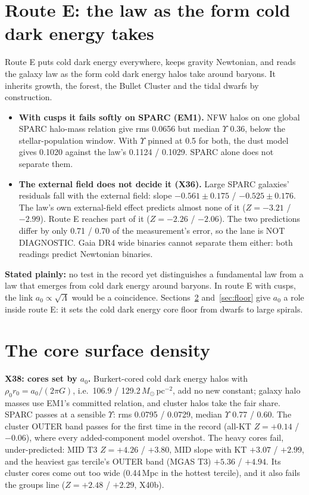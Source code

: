 \documentclass[10pt]{article}
\begin{document}
\section{Route E: the law as the form cold dark energy takes}
Route E puts cold dark energy everywhere, keeps gravity Newtonian, and reads the galaxy law as the form cold dark energy halos take around baryons. It inherits growth, the forest, the Bullet Cluster and the tidal dwarfs by construction.
\begin{itemize}
\item \textbf{With cusps it fails softly on SPARC (EM1).} NFW halos on one global SPARC halo-mass relation give rms 0.0656 but median $\Upsilon$ 0.36, below the stellar-population window. With $\Upsilon$ pinned at 0.5 for both, the dust model gives 0.1020 against the law's 0.1124 / 0.1029. SPARC alone does not separate them.
\item \textbf{The external field does not decide it (X36).} Large SPARC galaxies' residuals fall with the external field: slope $-0.561\pm0.175$ / $-0.525\pm0.176$. The law's own external-field effect predicts almost none of it ($Z=-3.21$ / $-2.99$). Route E reaches part of it ($Z=-2.26$ / $-2.06$). The two predictions differ by only 0.71 / 0.70 of the measurement's error, so the lane is NOT DIAGNOSTIC. Gaia DR4 wide binaries cannot separate them either: both readings predict Newtonian binaries.
\end{itemize}
\textbf{Stated plainly:} no test in the record yet distinguishes a fundamental law from a law that emerges from cold dark energy around baryons. In route E with cusps, the link $a_0\propto\sqrt\Lambda$ would be a coincidence. Sections~\ref{sec:core} and~\ref{sec:floor} give $a_0$ a role inside route E: it sets the cold dark energy core floor from dwarfs to large spirals.

\section{The core surface density}\label{sec:core}
\textbf{X38: cores set by $a_0$.} Burkert-cored cold dark energy halos with $\rho_0r_0=a_0/(2\pi G)$, i.e.\ 106.9 / 129.2\,$M_\odot$\,pc$^{-2}$, add no new constant; galaxy halo masses use EM1's committed relation, and cluster halos take the fair share. SPARC passes at a sensible $\Upsilon$: rms 0.0795 / 0.0729, median $\Upsilon$ 0.77 / 0.60. The cluster OUTER band passes for the first time in the record (all-KT $Z=+0.14$ / $-0.06$), where every added-component model overshot. The heavy cores fail, under-predicted: MID T3 $Z=+4.26$ / $+3.80$, MID slope with KT $+3.07$ / $+2.99$, and the heaviest gas tercile's OUTER band (MGAS T3) $+5.36$ / $+4.94$. Its cluster cores come out too wide (0.44\,Mpc in the hottest tercile), and it also fails the groups line ($Z=+2.48$ / $+2.29$, X40b).
\end{document}
